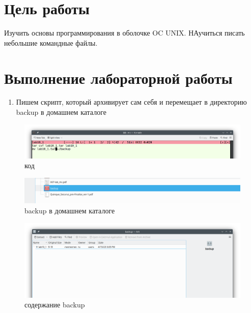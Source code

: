 \hypertarget{ux446ux435ux43bux44c-ux440ux430ux431ux43eux442ux44b}{%
\chapter{Цель
работы}\label{ux446ux435ux43bux44c-ux440ux430ux431ux43eux442ux44b}}

Изучить основы программирования в оболочке OC UNIX. НАучиться писать
небольшие командные файлы.

\hypertarget{ux432ux44bux43fux43eux43bux43dux435ux43dux438ux435-ux43bux430ux431ux43eux440ux430ux442ux43eux440ux43dux43eux439-ux440ux430ux431ux43eux442ux44b}{%
\chapter{Выполнение лабораторной
работы}\label{ux432ux44bux43fux43eux43bux43dux435ux43dux438ux435-ux43bux430ux431ux43eux440ux430ux442ux43eux440ux43dux43eux439-ux440ux430ux431ux43eux442ux44b}}

\begin{enumerate}
\def\labelenumi{\arabic{enumi}.}
\tightlist
\item
  Пишем скрипт, который архивирует сам себя и перемещает в директорию
  backup в домашнем каталоге
\end{enumerate}

\begin{figure}
\hypertarget{fig:001}{%
\centering
\includegraphics[width=1\textwidth,height=\textheight]{image/1.png}
\caption{код}\label{fig:001}
}
\end{figure}

\begin{figure}
\hypertarget{fig:002}{%
\centering
\includegraphics[width=1\textwidth,height=\textheight]{image/2.png}
\caption{backup в домашнем каталоге}\label{fig:002}
}
\end{figure}

\begin{figure}
\hypertarget{fig:003}{%
\centering
\includegraphics[width=1\textwidth,height=\textheight]{image/3.png}
\caption{содержание backup}\label{fig:003}
}
\end{figure}

